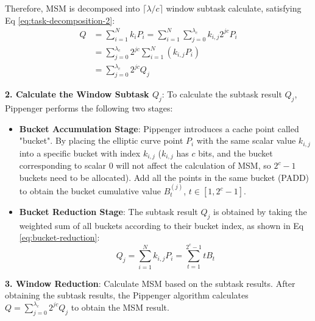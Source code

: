 \documentclass[journal=tches,final]{iacrtrans}
\begin{document}
Therefore, MSM is decomposed into $\lceil \lambda / c \rceil$ window subtask calculate, satisfying Eq \eqref{eq:task-decomposition-2}:
\begin{equation}
\begin{aligned}
\label{eq:task-decomposition-2}
Q &= \sum_{i=1}^N k_i P_i = \sum_{i=1}^N \sum_{j=0}^{\lambda_c} k_{i,j} 2^{j c} P_i \\
&= \sum_{j=0}^{\lambda_c} 2^{j c} \sum_{i=1}^N (k_{i,j} P_i) \\
&= \sum_{j=0}^{\lambda_c} 2^{j c} Q_j
\end{aligned}
\end{equation}

\textbf{2. Calculate the Window Subtask $Q_j$}: To calculate the subtask result $Q_j$, Pippenger performs the following two stages:
\begin{itemize}
\item \textbf{Bucket Accumulation Stage}: Pippenger introduces a cache point called "bucket". By placing the elliptic curve point $P_i$ with the same scalar value $k_{i,j}$ into a specific bucket with index $k_{i,j}$ ($k_{i,j}$ has $c$ bits, and the bucket corresponding to scalar 0 will not affect the calculation of MSM, so $2^c - 1$ buckets need to be allocated). Add all the points in the same bucket (PADD) to obtain the bucket cumulative value $B_t^{(j)}$, $t \in [1, 2^c - 1]$.
\item \textbf{Bucket Reduction Stage}: The subtask result $Q_j$ is obtained by taking the weighted sum of all buckets according to their bucket index, as shown in Eq \eqref{eq:bucket-reduction}:
\begin{equation}
\label{eq:bucket-reduction}
Q_j = \sum_{i=1}^N k_{i,j} P_i = \sum_{t=1}^{2^c - 1} t B_t
\end{equation}
\end{itemize}

\textbf{3. Window Reduction}: Calculate MSM based on the subtask results. After obtaining the subtask results, the Pippenger algorithm calculates $Q = \sum_{j=0}^{\lambda_c} 2^{j c} Q_j$ to obtain the MSM result.

\end{document}
